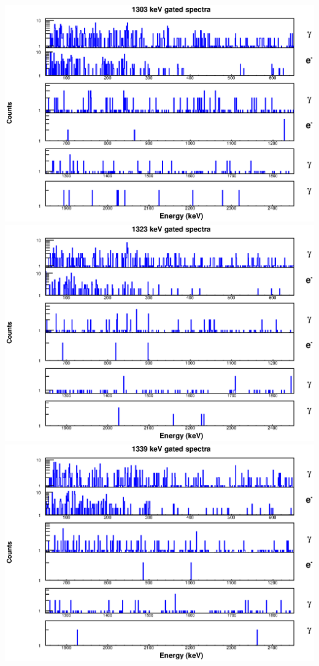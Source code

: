 \begin{landscape}
\includegraphics[scale=1.1]{154Gd_Appendix/1303_combined.eps}
\includegraphics[scale=1.1]{154Gd_Appendix/1323_combined.eps}
\includegraphics[scale=1.1]{154Gd_Appendix/1339_combined.eps}

\end{landscape}
